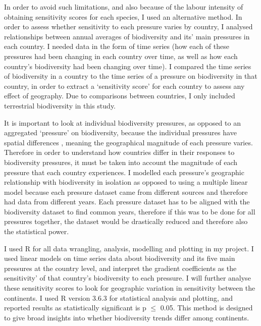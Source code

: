 \documentclass[11pt, a4paper, titlepage]{article}
\begin{document}
	In order to avoid such limitations, and also because of the labour intensity of obtaining sensitivity scores for each species, I used an alternative method. In order to assess whether sensitivity to each pressure varies by country, I analysed relationships between annual averages of biodiversity and its' main pressures in each country. I needed data in the form of time series (how each of these pressures had been changing in each country over time, as well as how each country's biodiversity had been changing over time). I compared the time series of biodiversity in a country to the time series of a pressure on biodiversity in that country, in order to extract a `sensitivity score' for each country to assess any effect of geography. Due to comparisons between countries, I only included terrestrial biodiversity in this study. 	 %


	It is important to look at individual biodiversity pressures, as opposed to an aggregated `pressure' on biodiversity, because the individual pressures have spatial differences \citep{steffen2015planetary}, meaning the geographical magnitude of each pressure varies. Therefore in order to understand how countries differ in their responses to biodiversity pressures, it must be taken into account the magnitude of each pressure that each country experiences. I modelled each pressure's geographic relationship with biodiversity in isolation as opposed to using a multiple linear model because each pressure dataset came from different sources and therefore had data from different years. Each pressure dataset has to be aligned with the biodiversity dataset to find common years, therefore if this was to be done for all pressures together, the dataset would be drastically reduced and therefore also the statistical power.
	
	I used R for all data wrangling, analysis, modelling and plotting in my project. I used linear models on time series data about biodiversity and its five main pressures at the country level, and interpret the gradient coefficients as the sensitivity' of that country's biodiversity to each pressure. I will further analyse these sensitivity scores to look for geographic variation in sensitivity between the continents. I used R version 3.6.3 for statistical analysis and plotting, and reported results as statistically significant is p $\leq$ 0.05. This method is designed to give broad insights into whether biodiversity trends differ among continents. \newline
\end{document}
